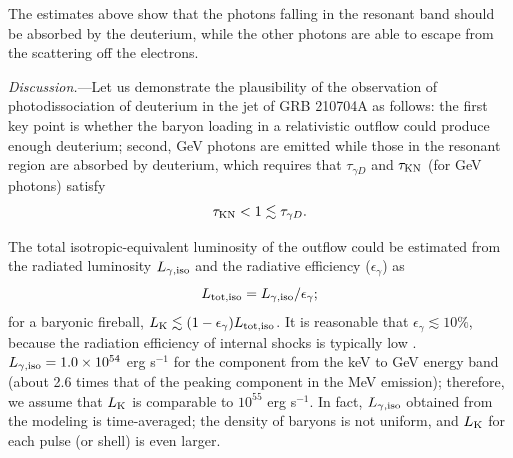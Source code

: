 \documentclass[prd,twocolumn,amsmath,amssymb,aps,linenumbers]{revtex4-2} %
\begin{document}
The estimates above show that the photons falling in the resonant band should be absorbed by the deuterium, while the other photons are able to escape from the scattering off the electrons.%


\textit{Discussion.}---Let us demonstrate
the plausibility of the observation of photodissociation of deuterium in the jet of GRB 210704A as follows: the first key point is whether the baryon loading in a relativistic outflow could produce enough deuterium;
second, GeV photons are emitted while those in the resonant region are absorbed by deuterium, which requires that $\tau_{\gamma D}$ and $\tau_{\rm KN}$ (for GeV photons) satisfy
\begin{equation}\label{eq:criterion}
    \tau_{\rm KN}<1\lesssim\tau_{\gamma D}.
\end{equation}

The total isotropic-equivalent luminosity of the outflow could be estimated from the radiated luminosity $L_{\gamma, \rm iso}$ and the radiative efficiency ($\epsilon_\gamma$) as
\begin{equation}
    L_{\rm tot, iso}= L_{\gamma, \rm iso}/\epsilon_\gamma;
\end{equation}
for a baryonic fireball, $L_{\rm K}\lesssim (1-\epsilon_\gamma)L_{\rm tot, iso}$.
It is reasonable that $\epsilon_\gamma\lesssim10\%$, because the radiation efficiency of internal shocks is typically low \citep[e.g.,][]{2011ApJ...726...90Z,2008FrPhC...3..306F}. $L_{\gamma, \rm iso}=1.0\times10^{54}$ erg s$^{-1}$ for the component from the keV to GeV energy band (about 2.6 times that of the peaking component in the MeV emission); therefore, we assume that $L_{\rm K}$ is comparable to $10^{55}$ erg s$^{-1}$.
In fact, $L_{\gamma, \rm iso}$ obtained from the modeling is time-averaged; the density of baryons is not uniform, and $L_{\rm K}$ for each pulse (or shell) is even larger.
\end{document}
